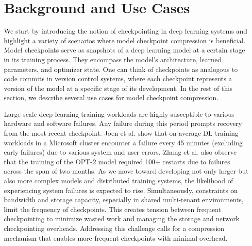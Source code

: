\section{Background and Use Cases}
\label{sec:background}


We start by introducing the notion of checkpointing in deep learning systems and highlight a variety of scenarios where model checkpoint compression is beneficial. Model checkpoints serve as snapshots of a deep learning model at a certain stage in its training process. They encompass the model's architecture, learned parameters, and optimizer state. One can think of checkpoints as analogous to code commits in version control systems, where each checkpoint represents a version of the model at a specific stage of its development. In the rest of this section, we describe several use cases for model checkpoint compression.



Large-scale deep-learning training workloads are highly susceptible to various hardware and software failures. 
Any failure during this period prompts recovery from the most recent checkpoint. 
Joen et al. \cite{philly} show that on average DL training workloads in a Microsoft cluster encounter a failure every 45 minutes (excluding early failures) due to various system and user errors. Zhang et al. \cite{opt2} also observe that the training of the OPT-2 
model required 100+ restarts due to failures across the span
of two months. As we move toward developing not only larger but also more complex models and distributed training systems, the likelihood of experiencing system failures is expected to rise. Simultaneously, constraints on bandwidth and storage capacity, especially in shared multi-tenant environments, limit the frequency of checkpoints. This creates tension between frequent checkpointing to minimize wasted work and managing the storage and network checkpointing overheads. Addressing this challenge calls for a compression mechanism that enables more frequent checkpoints with minimal overhead.



